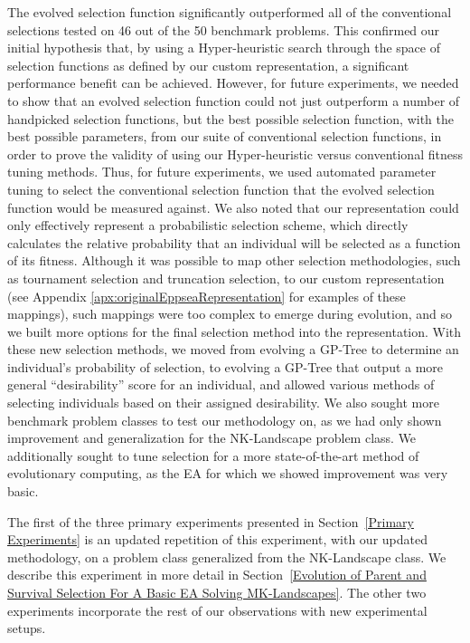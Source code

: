 \documentclass[sigconf]{acmart}
\begin{document}
The evolved selection function significantly outperformed all of the conventional selections tested on 46 out of the 50 benchmark problems. This confirmed our initial hypothesis that, by using a Hyper-heuristic search through the space of selection functions as defined by our custom representation, a significant performance benefit can be achieved. However, for future experiments, we needed to show that an evolved selection function could not just outperform a number of handpicked selection functions, but the best possible selection function, with the best possible parameters, from our suite of conventional selection functions, in order to prove the validity of using our Hyper-heuristic versus conventional fitness tuning methods. Thus, for future experiments, we used automated parameter tuning to select the conventional selection function that the evolved selection function would be measured against. We also noted that our representation could only effectively represent a probabilistic selection scheme, which directly calculates the relative probability that an individual will be selected as a function of its fitness. Although it was possible to map other selection methodologies, such as tournament selection and truncation selection, to our custom representation (see Appendix \ref{apx:originalEppseaRepresentation} for examples of these mappings), such mappings were too complex to emerge during evolution, and so we built more options for the final selection method into the representation. With these new selection methods, we moved from evolving a GP-Tree to determine an individual's probability of selection, to evolving a GP-Tree that output a more general ``desirability'' score for an individual, and allowed various methods of selecting individuals based on their assigned desirability. We also sought more benchmark problem classes to test our methodology on, as we had only shown improvement and generalization for the NK-Landscape problem class. We additionally sought to tune selection for a more state-of-the-art method of evolutionary computing, as the EA for which we showed improvement was very basic.

The first of the three primary experiments presented in Section~\ref{Primary Experiments} is an updated repetition of this experiment, with our updated methodology, on a problem class generalized from the NK-Landscape class. We describe this experiment in more detail in Section~\ref{Evolution of Parent and Survival Selection For A Basic EA Solving MK-Landscapes}. The other two experiments incorporate the rest of our observations with new experimental setups.
\end{document}
